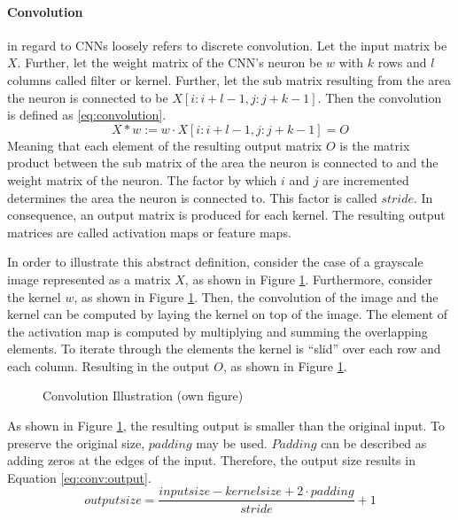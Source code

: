 		\paragraph{Convolution} in regard to \ac{CNN}s loosely refers to discrete convolution. Let the input matrix be $X$. Further, let the weight matrix of the \ac{CNN}'s neuron be $w$ with $k$ rows and $l$ columns called filter or kernel. Further, let the sub matrix resulting from the area the neuron is connected to be $X[i:i+l-1, j:j+k-1]$. Then the convolution is defined as \eqref{eq:convolution}.
			\begin{equation}
				\label{eq:convolution}
				X * w := w \cdot X[i:i+l-1, j:j+k-1] = O
			\end{equation}
		Meaning that each element of the resulting output matrix $O$ is the matrix product between the sub matrix of the area the neuron is connected to and the weight matrix of the neuron. The factor by which $i$ and $j$ are incremented determines the area the neuron is connected to. This factor is called $stride$. In consequence, an output matrix is produced for each kernel. The resulting output matrices are called activation maps or feature maps. \autocite{Zhang.2015c}
		\par
		In order to illustrate this abstract definition, consider the case of a grayscale image represented as a matrix $X$, as shown in Figure \ref{img:conv}. Furthermore, consider the kernel $w$, as shown in Figure \ref{img:conv}. Then, the convolution of the image and the kernel can be computed by laying the kernel on top of the image. The element of the activation map is computed by multiplying and summing the overlapping elements. To iterate through the elements the kernel is \enquote{slid} over each row and each column. Resulting in the output $O$, as shown in Figure \ref{img:conv}.
		\begin{figure}[H]
			\centering
			
			\caption{Convolution Illustration (own figure)} \label{img:conv}
		\end{figure}
		As shown in Figure \ref{img:conv}, the resulting output is smaller than the original input. To preserve the original size, $padding$ may be used. $Padding$ can be described as adding zeros at the edges of the input. Therefore, the output size results in Equation \eqref{eq:conv:output}.\autocite{Conneau.2016}
		\begin{equation}
			output size = \frac{input size - kernel size + 2 \cdot padding}{stride} + 1
			\label{eq:conv:output}
		\end{equation}

